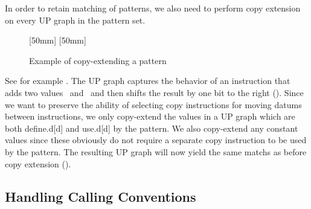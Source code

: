 In order to retain matching of \glspl{pattern}, we also need to perform
\gls{copy extension} on every \gls{UP graph} in the \gls{pattern set}.
%
\begin{figure}
  \setlength{\opNodeDist}{12pt}%

  \mbox{}%
  \hfill%
                [50mm]%
                {%
                }%
  \hfill%
                [50mm]%
                {%
                }%
  \hfill%
  \mbox{}

  \caption{Example of copy-extending a pattern}
\end{figure}
%
See for example .
%
The \gls{UP graph} captures the behavior of an \gls{instruction} that adds two
values~ and~ and then shifts the result by one bit to the
right ().
%
Since we want to preserve the ability of selecting copy \glspl{instruction} for
moving \glspl{datum} between \glspl{instruction}, we only copy-extend the values
in a \gls{UP graph} which are both \gls{define.d}[d] and \gls{use.d}[d] by the
\gls{pattern}.
%
We also copy-extend any constant values since these obviously do not require a
separate copy \gls{instruction} to be used by the \gls{pattern}.
%
The resulting \gls{UP graph} will now yield the same \glspl{match} as before
\gls{copy extension} ().


\subsection{Handling Calling Conventions}

